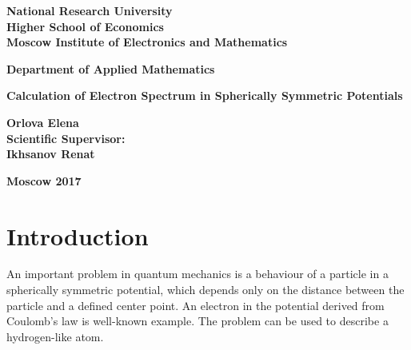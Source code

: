 \documentclass[a4paper, 12pt]{article}
\begin{document}
	\begin{center}
		\large
		\textbf{National Research University}			
		\\
		\textbf{Higher School of Economics}									\\[3 cm]
		\textbf{Moscow Institute of Electronics and Mathematics}			\\[2 cm]
									
	\end{center}
	
	\begin{center}
		\large
		\textbf{Department of Applied Mathematics}		\\[3 cm]
	\end{center}
	
	
	
	\begin{center}
		\large
		\textbf{Calculation of Electron Spectrum in Spherically Symmetric Potentials}		\\[6 cm]
		
	\end{center}
	
	\begin{flushright}
		\large
		\textbf{Orlova Elena}				\\
		\textbf{Scientific Supervisor:}			\\
		\textbf{Ikhsanov Renat}		\\
	\end{flushright}
	
	\vfill
	\begin{center}
		\large
		\textbf{Moscow 2017}
	\end{center}
	\pagebreak
	
	
	
	

\tableofcontents
\pagebreak
	
\section{Introduction}

An important problem in quantum mechanics is a behaviour of a particle in a spherically symmetric potential, which depends only on the distance between the particle and a defined center point. An electron in the potential derived from Coulomb's law is well-known example. The problem can be used to describe a hydrogen-like atom. 
\end{document}
